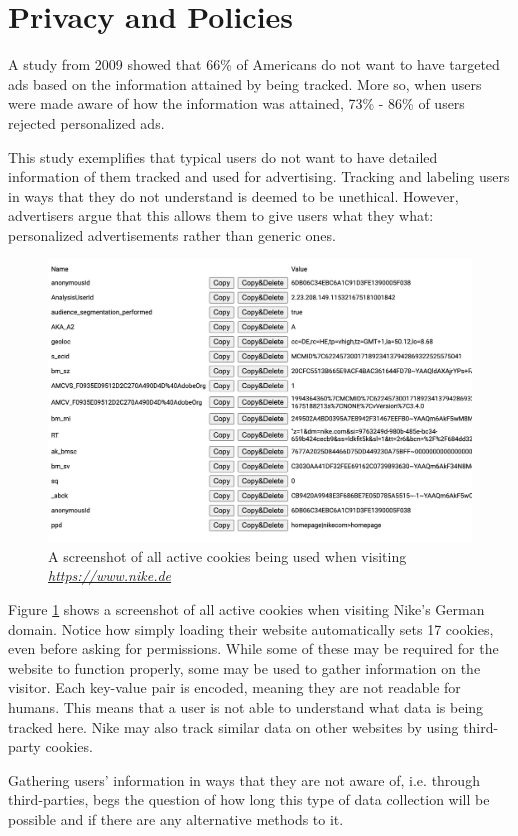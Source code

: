 %
%
\section{Privacy and Policies}
\label{sec:bg_cookies:privacy}

A study from 2009 showed that 66\% of Americans do not want to have targeted ads based on the information attained by being tracked. More so, when users were made aware of how the information was attained, 73\% - 86\% of users rejected personalized ads. \cite{americansRejectAds}

This study exemplifies that typical users do not want to have detailed information of them tracked and used for advertising. Tracking and labeling users in ways that they do not understand is deemed to be unethical. However, advertisers argue that this allows them to give users what they what: personalized advertisements rather than generic ones. \cite{americansRejectAds}

\begin{figure}[t]
\includegraphics[width=\textwidth]{./gfx/cookiesScreenshot.png}
\centering
\caption{A screenshot of all active cookies being used when visiting \textit{\url{https://www.nike.de}}}
\label{fig:nikeCookies}
\end{figure}

Figure \ref{fig:nikeCookies} shows a screenshot of all active cookies when visiting Nike's German domain. Notice how simply loading their website automatically sets 17 cookies, even before asking for permissions. While some of these may be required for the website to function properly, some may be used to gather information on the visitor. Each key-value pair is encoded, meaning they are not readable for humans. This means that a user is not able to understand what data is being tracked here. Nike may also track similar data on other websites by using third-party cookies.


Gathering users' information in ways that they are not aware of, i.e. through third-parties, begs the question of how long this type of data collection will be possible and if there are any alternative methods to it.


